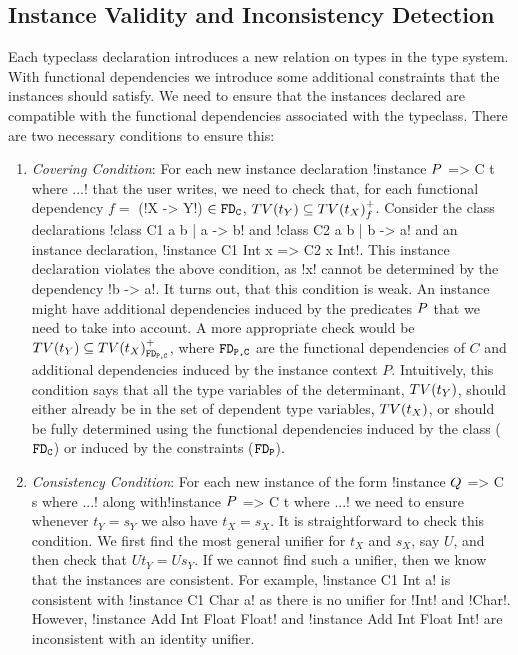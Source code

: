 \documentclass[format=sigplan,manuscript,review,screen,nonacm,margin=1in]{acmart}
\begin{document}
\subsection{Instance Validity and Inconsistency Detection}
Each typeclass declaration introduces a new relation on types in the type system. With functional dependencies
we introduce some additional constraints that the instances should satisfy.
We need to ensure that the instances declared are compatible
with the functional dependencies associated with the typeclass.
There are two necessary conditions to ensure this:
\begin{enumerate}[topsep={0pt},partopsep={0pt}]
\item\emph{Covering Condition}:  For each new instance declaration !instance $P$ => C t where ...!
  that the user writes, we need to check that, for each functional dependency
  $f =$ (!X -> Y!) $\in \texttt{FD}_\texttt{C}$,
  $TV(t_Y) \subseteq {TV(t_X)}^{+}_{f}$. Consider the class declarations !class C1 a b | a -> b!
  and !class C2 a b | b -> a! and an instance declaration,
  !instance C1 Int x => C2 x Int!. This instance declaration violates the above condition,
  as !x! cannot be determined by the dependency !b -> a!.
  It turns out, that this condition is weak\cite{jones_language_2008}.
  An instance might have additional dependencies induced by the predicates $P$
  that we need to take into account. A more appropriate check would be
  $TV(t_Y) \subseteq {TV(t_X)}^{+}_{\texttt{FD}_\texttt{{P,C}}}$,
  where $\texttt{FD}_\texttt{{P,C}}$ are the functional dependencies of $C$ and additional dependencies
  induced by the instance context $P$. Intuitively, this condition says that
  all the type variables of the determinant, $TV(t_Y)$, should either already be in the
  set of dependent type variables, $TV(t_X)$, or should be fully determined using the
  functional dependencies induced by the class ($\texttt{FD}_\texttt{C}$) or induced by the constraints ($\texttt{FD}_\texttt{P}$).
\item\emph{Consistency Condition}: For each new instance of the form !instance $Q$ => C s where ...!
  along with\newline !instance $P$ => C t where ...! we need to ensure whenever $t_Y = s_Y$ we also have $t_X = s_X$.
  It is straightforward to check this condition. We first find the most general unifier for $t_X$ and $s_X$,
  say $U$, and then check that $U t_Y = U s_Y$. If we cannot find such a unifier, then we know that
  the instances are consistent. For example, !instance C1 Int a! is consistent with !instance C1 Char a!
  as there is no unifier for !Int! and !Char!. However, !instance Add Int Float Float!
  and !instance Add Int Float Int! are inconsistent with an identity unifier.
\end{enumerate}
\end{document}
